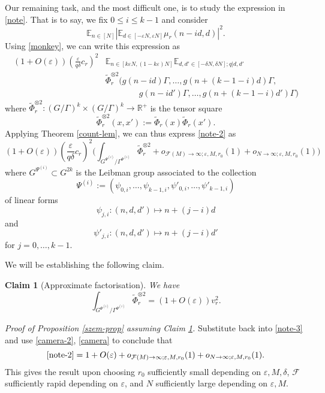 \documentclass[11pt,reqno]{amsart}
\numberwithin{equation}{section}
\theoremstyle{plain}
\newtheorem{claim}[subsection]{Claim}
\theoremstyle{definition}
\renewcommand{\leq}{\leqslant}
\newcommand\E{{\mathbb{E}}}
\newcommand\R{\mathbb{R}}
\newcommand\1{{\bf 1}}
\newcommand\2{{\bf 2}}
\newcommand\eps{\varepsilon}
\newcommand\Grow{{\mathcal F}}
\begin{document}
Our remaining task, and the most difficult one, is to study the expression in \eqref{note}. That is to say, we fix $0 \leq i \leq k-1$ and consider 
\begin{equation}\label{note-2}
\E_{n \in [N]} |\E_{d \in [-\eps N,\eps N]} \mu_r(n-id,d)|^2.
\end{equation}
Using \eqref{monkey}, we can write this expression as
\begin{align*}
(1 +O(\eps)) (\frac{\eps}{q\delta} c_r)^2 & \E_{n \in [k\eps N, (1-k\eps)N]}  \E_{d,d' \in [-\delta N, \delta N]; q|d,d'}\\
&\tilde \Phi^{\otimes 2}_r( g(n-id)\Gamma,\ldots,g(n+(k-1-i)d)\Gamma, \\ & \qquad \qquad  g(n-id')\Gamma,\ldots,g(n+(k-1-i)d')\Gamma )
\end{align*}
where $\tilde \Phi^{\otimes 2}_r: (G/\Gamma)^k \times (G/\Gamma)^k \to \R^+$ is the tensor square
$$ \tilde \Phi^{\otimes 2}_r( x, x' ) := \tilde \Phi_r(x) \tilde \Phi_r(x').$$
Applying Theorem \ref{count-lem}, we can thus express \eqref{note-2} as
\begin{equation}\label{note-3}
(1+O(\eps)) (\frac{\eps}{q\delta} c_r)^2\big ( \int_{G^{\Psi^{(i)}}/\Gamma^{\Psi^{(i)}}} \tilde \Phi_r^{\otimes 2} + o_{\Grow(M) \to \infty; \eps,M,r_0}(1) + o_{N \to \infty; \eps,M,r_0}(1) \big)
\end{equation}
where $G^{\Psi^{(i)}} \subset G^{2k}$ is the Leibman group associated to the collection
$$ \Psi^{(i)} := ( \psi_{0,i},\ldots,\psi_{k-1,i}, \psi'_{0,i}, \ldots, \psi'_{k-1,i} )$$
of linear forms 
$$ \psi_{j,i}: (n,d,d') \mapsto n+(j-i)d$$
and
$$ \psi'_{j,i}: (n,d,d') \mapsto n+(j-i)d'$$ 
for $j=0,\ldots,k-1$.

We will be establishing the following claim.

\begin{claim}[Approximate factorisation]\label{approx-factor}  We have
\begin{equation}\label{facta}
 \int_{G^{\Psi^{(i)}}/\Gamma^{\Psi^{(i)}}} \tilde \Phi_r^{\otimes 2} = (1+O(\eps)) v_r^2.
 \end{equation}
\end{claim}

\emph{Proof of Proposition \ref{szem-prop} assuming Claim \ref{approx-factor}.} Substitute back into \eqref{note-3} and use \eqref{camera-2}, \eqref{camera} to conclude that
$$ \eqref{note-2} = 1 + O(\eps) + o_{\Grow(M) \to \infty; \eps,M,r_0}(1) + o_{N \to \infty; \eps,M,r_0}(1). $$
This gives the result upon choosing $r_0$ sufficiently small depending on $\eps, M, \delta$, $\Grow$ sufficiently rapid depending on $\eps$, and $N$ sufficiently large depending on $\eps, M$.
\end{document}
